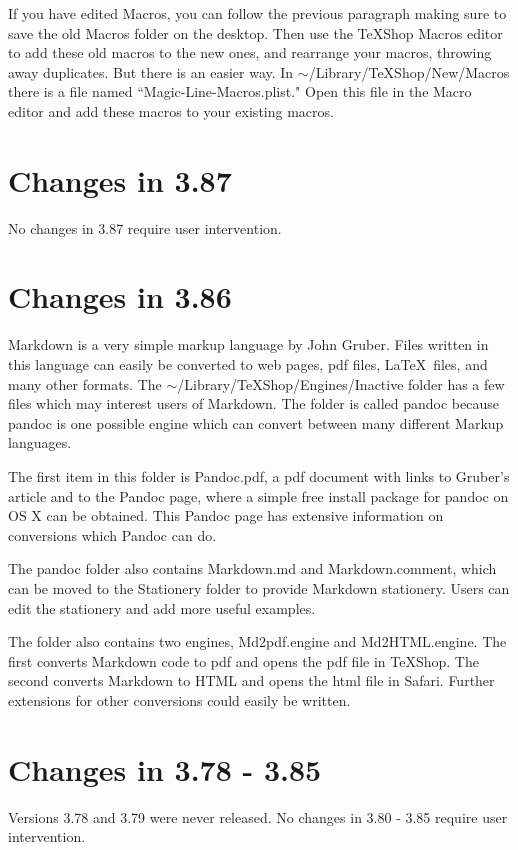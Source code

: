\documentclass[11pt, oneside]{amsart}
\begin{document}
If you have edited Macros, you can follow the previous paragraph making sure to save the old Macros folder on the desktop. Then use the TeXShop Macros editor to add these old macros to the new ones, and rearrange your macros, throwing away duplicates. But there is an easier way. In $\sim$/Library/TeXShop/New/Macros there is a file named ``Magic-Line-Macros.plist." Open this file in the Macro editor and add these macros to your existing macros.


\section{Changes in 3.87}

No changes in 3.87 require user intervention.

\section{Changes in 3.86}

Markdown is a very simple markup language by John Gruber. Files written in this language can easily be converted to web pages, pdf files, \LaTeX\ files, and many other formats. The $\sim$/Library/TeXShop/Engines/Inactive folder has a few files which may interest users of Markdown. The folder is called pandoc because pandoc is one possible engine which can convert between many different Markup languages. 

The first item in this folder is Pandoc.pdf, a pdf document with links to Gruber's article and to the Pandoc page, where a simple free install package for pandoc on OS X can be obtained. This Pandoc page has extensive information on conversions which Pandoc can do.

The pandoc folder also contains Markdown.md and Markdown.comment, which can be moved to the Stationery folder to provide Markdown stationery. Users can edit the stationery and add more useful examples.

The folder also contains two engines, Md2pdf.engine and Md2HTML.engine. The first converts Markdown code to pdf and opens the pdf file in TeXShop. The second converts Markdown to HTML and opens the html file in Safari.
Further extensions for other conversions could easily be written.

\section{Changes in 3.78 - 3.85}

Versions 3.78 and 3.79 were never released. No changes in 3.80 - 3.85 require user intervention.
\end{document}
